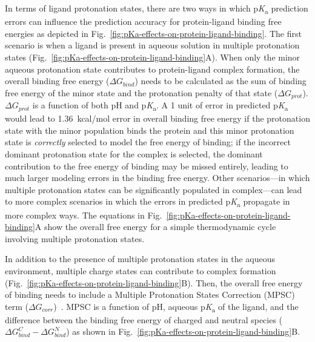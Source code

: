 \documentclass[9pt,lineno,final]{elife}
\newcommand{\pKa}{p\textit{K}\textsubscript{a}}
\begin{document}
In terms of ligand protonation states, there are two ways in which \pKa{} prediction errors can influence the prediction accuracy for protein-ligand binding free energies as depicted in Fig.~\ref{fig:pKa-effects-on-protein-ligand-binding}. 
The first scenario is when a ligand is present in aqueous solution in multiple protonation states (Fig.~\ref{fig:pKa-effects-on-protein-ligand-binding}A).
When only the minor aqueous protonation state contributes to protein-ligand complex formation, the overall binding free energy ($\Delta G_{bind}$) needs to be calculated as the sum of binding free energy of the minor state and the protonation penalty of that state ($\Delta G_{prot}$). 
$\Delta G_{prot}$ is a function of both pH and \pKa{}.
A 1 unit of error in predicted \pKa{} would lead to 1.36~kcal/mol error in overall binding free energy if the protonation state with the minor population binds the protein and this minor protonation state is \emph{correctly} selected to model the free energy of binding; if the incorrect dominant protonation state for the complex is selected, the dominant contribution to the free energy of binding may be missed entirely, leading to much larger modeling errors in the binding free energy. 
Other scenarios---in which multiple protonation states can be significantly populated in complex---can lead to more complex scenarios in which the errors in predicted \pKa{} propagate in more complex ways.
The equations in Fig.~\ref{fig:pKa-effects-on-protein-ligand-binding}A show the overall free energy for a simple thermodynamic cycle involving multiple protonation states.



In addition to the presence of multiple protonation states in the aqueous environment, multiple charge states can contribute to complex formation (Fig.~\ref{fig:pKa-effects-on-protein-ligand-binding}B). 
Then, the overall free energy of binding needs to include a Multiple Protonation States Correction (MPSC) term ($\Delta G_{corr}$)~\citep{deOliveira:2019:J.Chem.TheoryComput.}. 
MPSC is a function of pH, aqueous \pKa{} of the ligand, and the difference between the binding free energy of charged and neutral species ($\Delta G_{bind}^{C} - \Delta G_{bind}^{N}$) as shown in Fig.~\ref{fig:pKa-effects-on-protein-ligand-binding}B.
\end{document}
